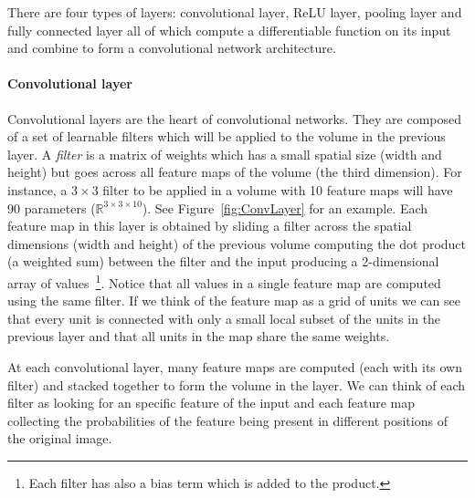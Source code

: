 There are four types of layers: convolutional layer, ReLU layer, pooling layer and fully connected layer all of which compute a differentiable function on its input and combine to form a convolutional network architecture.

\paragraph{Convolutional layer} Convolutional layers are the heart of convolutional networks. They are composed of a set of learnable filters which will be applied to the volume in the previous layer. A \emph{filter} is a matrix of weights 
which has a small spatial size (width and height) but goes across all feature maps of the volume (the third dimension). For instance, a $3\times 3$ filter to be applied in a volume with 10 feature maps will have 90 parameters ($\mathbb{R}^{3\times3\times10}$). See Figure~\ref{fig:ConvLayer} for an example. Each feature map in this layer is obtained by sliding a filter across the spatial dimensions (width and height) of the previous volume computing the dot product (a weighted sum) between the filter and the input producing a 2-dimensional array of values~\footnote{Each filter has also a bias term which is added to the product.}. Notice that all values in a single feature map are computed using the same filter. If we think of the feature map as a grid of units we can see that every unit is connected with only a small local subset of the units in the previous layer and that all units in the map share the same weights. 

At each convolutional layer, many feature maps are computed (each with its own filter) and stacked together to form the volume in the layer. We can think of each filter as looking for an specific feature of the input and each feature map collecting the probabilities of the feature being present in different positions of the original image.

